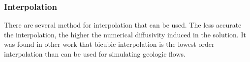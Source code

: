 \documentclass{article}
\begin{document}
\subsubsection*{Interpolation}
There are several method for interpolation that can be used. The less accurate the interpolation, the higher the numerical diffusivity induced in the solution. It was found in other work that bicubic interpolation is the lowest order interpolation than can be used for simulating geologic flows. 
\newline
\end{document}
